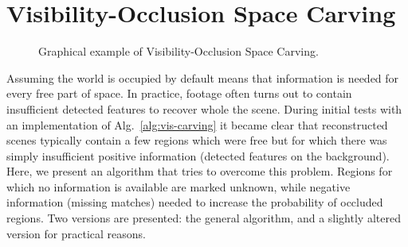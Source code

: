 \section{Visibility-Occlusion Space Carving}  \label{vis-occ-carving}

\begin{figure}[htb!]
 \centering
 \caption{Graphical example of Visibility-Occlusion Space Carving.}
 \label{fig:vis-occ-carving}
\end{figure}

Assuming the world is occupied by default means that information is needed for every free part of space. In practice, footage often turns out to contain insufficient detected features to recover whole the scene. During initial tests with an implementation of Alg.~\ref{alg:vis-carving} it became clear that reconstructed scenes typically contain a few regions which were free but for which there was simply insufficient positive information (\eg detected features on the background). Here, we present an algorithm that tries to overcome this problem. Regions for which no information is available are marked unknown, while negative information (\ie missing matches) needed to increase the probability of occluded regions. Two versions are presented: the general algorithm, and a slightly altered version for practical reasons.

